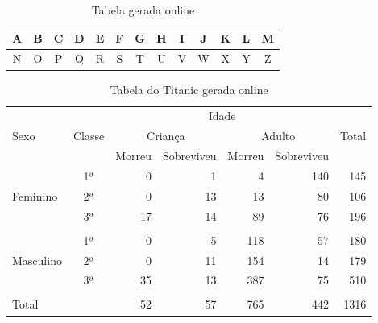 \documentclass[12pt]{article}   %
\begin{document}
		\begin{table}[h!]
			\centering
			\caption{Tabela gerada online}
			\label{tab_auto}
			\begin{tabular}{|c|c|c|c|c|c|c|c|c|c|c|c|c|}
				\hline
				A & B & C & D & E & F & G & H & I & J & K & L & M \\ \hline
				N & O & P & Q & R & S & T & U & V & W & X & Y & Z \\ \hline
			\end{tabular}
		\end{table}

		\begin{table}[h!]
			\centering
			\caption{Tabela do Titanic gerada online}
			\label{tab_titauto}
			\begin{tabular}{l|c|r|r|r|r|r}
				\hline
				&        & \multicolumn{4}{c|}{Idade}                                 &       \\ \cline{3-6}
				Sexo      & Classe & \multicolumn{2}{c|}{Criança} & \multicolumn{2}{c|}{Adulto} & Total \\ \cline{3-6}
				&        & Morreu      & Sobreviveu     & Morreu     & Sobreviveu     &       \\ \hline
				& 1ª     & 0           & 1              & 4          & 140            & 145   \\
				Feminino  & 2ª     & 0           & 13             & 13         & 80             & 106   \\
				& 3ª     & 17          & 14             & 89         & 76             & 196   \\
				&        &             &                &            &                &       \\ \hline
				& 1ª     & 0           & 5              & 118        & 57             & 180   \\
				Masculino & 2ª     & 0           & 11             & 154        & 14             & 179   \\
				& 3ª     & 35          & 13             & 387        & 75             & 510   \\
				&        &             &                &            &                &       \\ \hline
				Total     &        & 52          & 57             & 765        & 442            & 1316  \\ \hline
			\end{tabular}
		\end{table}
\end{document}
